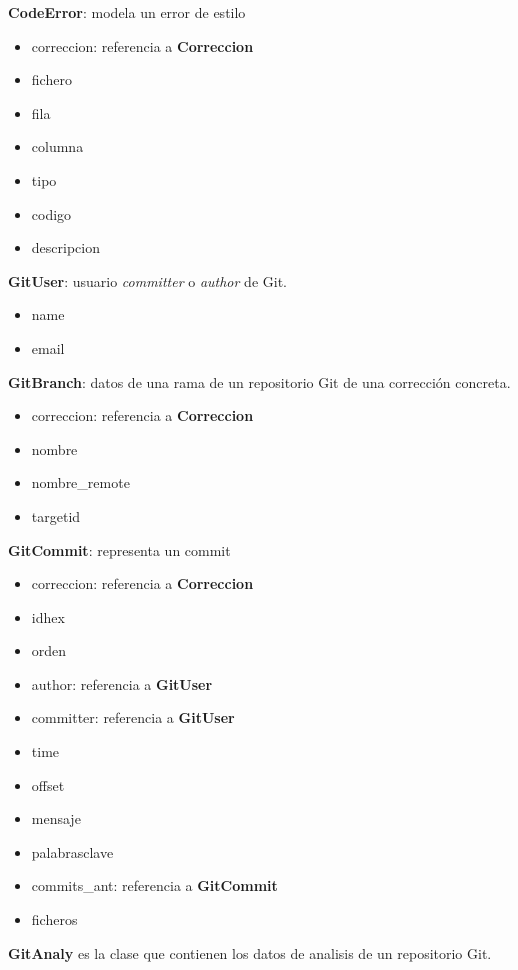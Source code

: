 \begin{description}
\item \textbf{}
\item \textbf{CodeError}: modela un error de estilo
\begin{itemize}
\item correccion: referencia a \textbf{Correccion}
\item fichero
\item fila
\item columna
\item tipo
\item codigo
\item descripcion
\end{itemize}
\item \textbf{GitUser}: usuario \textit{committer} o \textit{author} de Git.
\begin{itemize}
\item  name
\item email
\end{itemize}
\item \textbf{GitBranch}: datos de una rama de un repositorio Git de una corrección concreta.
\begin{itemize}
\item correccion: referencia a \textbf{Correccion}
\item nombre
\item nombre\_remote
\item targetid
\end{itemize}
\item \textbf{GitCommit}: representa un commit
\begin{itemize}
\item correccion: referencia a \textbf{Correccion}
\item idhex
\item orden
\item author: referencia a \textbf{GitUser}
\item committer: referencia a \textbf{GitUser}
\item time
\item offset
\item mensaje
\item palabrasclave
\item commits\_ant: referencia a \textbf{GitCommit}
\item ficheros
\end{itemize}
\item \textbf{GitAnaly} es la clase que contienen los datos de analisis de un repositorio Git.
\begin{itemize}

\end{itemize}
\end{description}
